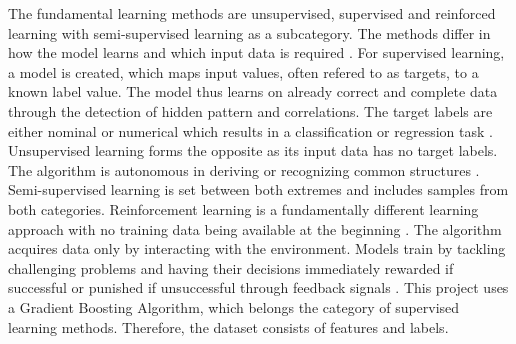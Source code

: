The fundamental learning methods are unsupervised, supervised and reinforced learning with 
semi-supervised learning as a subcategory. The methods differ in how the model learns and which 
input data is required \cite[4]{2018VDMAQuick}. For supervised learning, a model is created, which 
maps input values, often refered to as targets, to a known label value. The model thus learns 
on already correct and complete data through the detection of hidden pattern and correlations. 
The target labels are either nominal or numerical which results in a classification or regression 
task \cite[46]{Paass2020}.
Unsupervised learning forms the opposite as its input data has no target labels. The algorithm 
is autonomous in deriving or recognizing common structures \cite[97]{schacht2019blockchain}. Semi-supervised learning is set
between both extremes and includes samples from both categories. Reinforcement learning is 
a fundamentally different learning approach with no training data being available at the 
beginning \cite[7]{2018VDMAQuick}. The algorithm acquires data only by interacting with the environment. Models train by 
tackling challenging problems and having their decisions immediately rewarded if successful or 
punished if unsuccessful through feedback signals \cite[98]{schacht2019blockchain}.
This project uses a Gradient Boosting Algorithm, which belongs the category of supervised learning methods.
Therefore, the dataset consists of features and labels.


